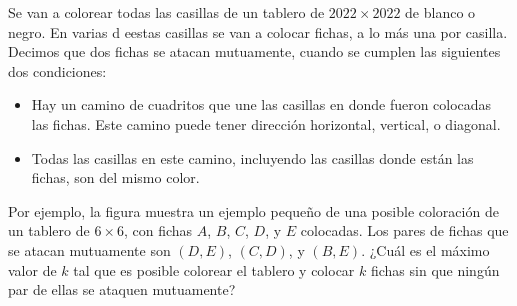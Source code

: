 Se van a colorear todas las casillas de un tablero de $2022\times 2022$ de blanco o negro. En varias d eestas casillas se van a colocar fichas, a lo más una por casilla. Decimos que dos fichas se atacan mutuamente, cuando se cumplen las siguientes dos condiciones:
 \begin{itemize} 
 \item  Hay un camino de cuadritos que une las casillas en donde fueron colocadas las fichas. Este camino puede tener dirección horizontal, vertical, o diagonal. 
 \item  Todas las casillas en este camino, incluyendo las casillas donde están las fichas, son del mismo color.
 \end{itemize} 
Por ejemplo, la figura muestra un ejemplo pequeño de una posible coloración de un tablero de $6\times 6$, con fichas $A$, $B$, $C$, $D$, y $E$ colocadas. Los pares de fichas que se atacan mutuamente son $(D,E)$, $(C,D)$, y $(B,E)$.  \newline  
¿Cuál es el máximo valor de $k$ tal que es posible colorear el tablero y colocar $k$ fichas sin que ningún par de ellas se ataquen mutuamente?